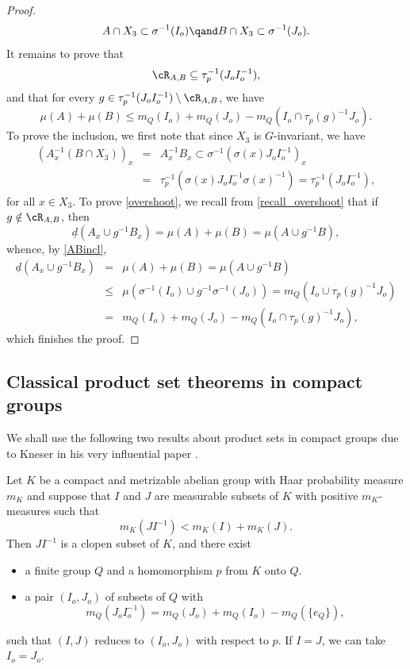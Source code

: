 \begin{proof}
\begin{equation}
\label{ABincl}
A \cap X_3 \subset \sigma^{-1}(I_o) \qand B \cap X_3 \subset \sigma^{-1}(J_o).
\end{equation}
It remains to prove that
\[
\cR_{A,B} \subseteq \tau_p^{-1}(J_o I_o^{-1}),
\]
and that for every $g \in \tau_p^{-1}(J_o I_o^{-1}) \setminus \cR_{A,B}$, we have
\begin{equation}
\label{overshoot}
\mu(A) + \mu(B) \leq m_Q(I_o) + m_Q(J_o) - m_Q(I_o \cap \tau_p(g)^{-1}J_o).
\end{equation}
To prove the inclusion, we first note that since $X_3$ is $G$-invariant, we have
\begin{eqnarray*}
(A_x^{-1}(B \cap X_3))_x
&=&
A_x^{-1} B_x \subset \sigma^{-1}(\sigma(x)J_o I_o^{-1})_x \\
&=& \tau_p^{-1}(\sigma(x)J_o I_o^{-1}\sigma(x)^{-1}) = \tau_p^{-1}(J_o I_o^{-1}),
\end{eqnarray*}
for all $x \in X_3$. To prove \eqref{overshoot}, we recall from \eqref{recall_overshoot} that if $g \notin \cR_{A,B}$, then
\[
\underline{d}(A_x \cup g^{-1}B_x)
= \mu(A) + \mu(B) = \mu(A \cup g^{-1}B),
\]
whence, by \eqref{ABincl},
\begin{eqnarray*}
\underline{d}(A_x \cup g^{-1}B_x)
&=& \mu(A) + \mu(B) = \mu(A \cup g^{-1}B) \\
&\leq &
\mu(\sigma^{-1}(I_o) \cup g^{-1} \sigma^{-1}(J_o))
=
m_Q(I_o \cup \tau_p(g)^{-1}J_o) \\
&=&
m_Q(I_o) + m_Q(J_o) - m_Q(I_o \cap \tau_p(g)^{-1}J_o),
\end{eqnarray*}
which finishes the proof.
\end{proof}

\subsection{Classical product set theorems in compact groups}

We shall use the following two results about product sets in compact groups due to Kneser in his very influential paper \cite{Kneser}.

\begin{theorem}
\label{thm_Kneser1}
Let $K$ be a compact and metrizable abelian group with Haar probability measure $m_K$ and suppose that $I$ and $J$ are measurable subsets of $K$
with positive $m_K$-measures such that
\[
m_K(JI^{-1}) < m_K(I) + m_K(J).
\]
Then $JI^{-1}$ is a clopen subset of $K$, and there exist

\begin{itemize}
\item a finite group $Q$ and a homomorphism $p$ from $K$ onto $Q$.
\item a pair $(I_o,J_o)$ of subsets of $Q$ with
\[
m_Q(J_o I_o^{-1}) = m_Q(J_o) + m_Q(I_o) - m_Q(\{e_Q\}),
\]
\end{itemize}
such that $(I,J)$ reduces to $(I_o,J_o)$ with respect to $p$. If $I = J$, we can take $I_o = J_o$.
\end{theorem}

